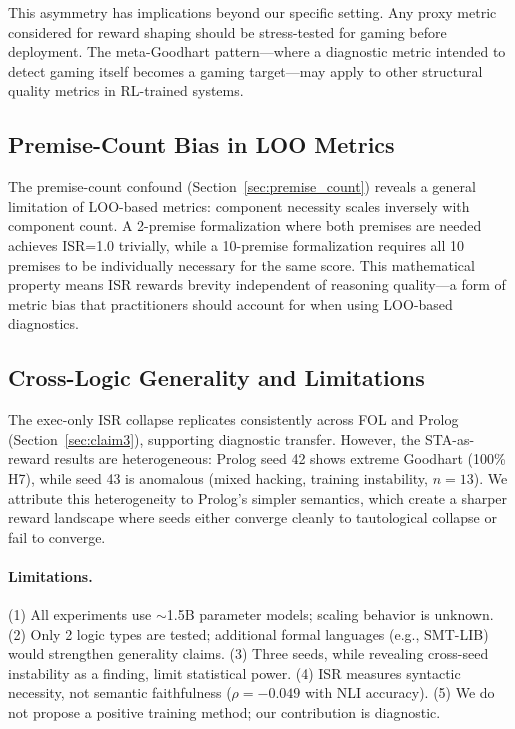 \documentclass[11pt,a4paper]{article}
\newcommand{\isr}{\textsc{ISR}}
\begin{document}
This asymmetry has implications beyond our specific setting.
Any proxy metric considered for reward shaping should be stress-tested for gaming before deployment.
The meta-Goodhart pattern---where a diagnostic metric intended to detect gaming itself becomes a gaming target---may apply to other structural quality metrics in RL-trained systems.

\subsection{Premise-Count Bias in LOO Metrics}

The premise-count confound (Section~\ref{sec:premise_count}) reveals a general limitation of LOO-based metrics: component necessity scales inversely with component count.
A 2-premise formalization where both premises are needed achieves \isr{}=1.0 trivially, while a 10-premise formalization requires all 10 premises to be individually necessary for the same score.
This mathematical property means \isr{} rewards brevity independent of reasoning quality---a form of metric bias that practitioners should account for when using LOO-based diagnostics.

\subsection{Cross-Logic Generality and Limitations}

The exec-only ISR collapse replicates consistently across FOL and Prolog (Section~\ref{sec:claim3}), supporting diagnostic transfer.
However, the STA-as-reward results are heterogeneous: Prolog seed 42 shows extreme Goodhart (100\% H7), while seed 43 is anomalous (mixed hacking, training instability, $n{=}13$).
We attribute this heterogeneity to Prolog's simpler semantics, which create a sharper reward landscape where seeds either converge cleanly to tautological collapse or fail to converge.

\paragraph{Limitations.}
(1) All experiments use ${\sim}$1.5B parameter models; scaling behavior is unknown.
(2) Only 2 logic types are tested; additional formal languages (e.g., SMT-LIB) would strengthen generality claims.
(3) Three seeds, while revealing cross-seed instability as a finding, limit statistical power.
(4) \isr{} measures syntactic necessity, not semantic faithfulness ($\rho{=}{-}0.049$ with NLI accuracy).
(5) We do not propose a positive training method; our contribution is diagnostic.
\end{document}
